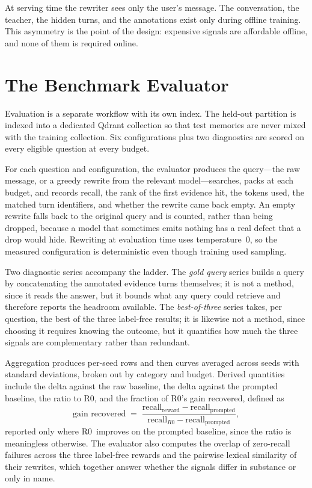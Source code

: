 \documentclass[12pt,letterpaper,oneside]{report}
\newcommand{\Rz}{R0}
\begin{document}
At serving time the rewriter sees only the user's message. The conversation,
the teacher, the hidden turns, and the annotations exist only during offline
training. This asymmetry is the point of the design: expensive signals are
affordable offline, and none of them is required online.

\section{The Benchmark Evaluator}
\label{sec:evaluator}

Evaluation is a separate workflow with its own index. The held-out partition is
indexed into a dedicated Qdrant collection so that test memories are never
mixed with the training collection. Six configurations plus two diagnostics are
scored on every eligible question at every budget.

For each question and configuration, the evaluator produces the query---the raw
message, or a greedy rewrite from the relevant model---searches, packs at each
budget, and records recall, the rank of the first evidence hit, the tokens
used, the matched turn identifiers, and whether the rewrite came back empty. An
empty rewrite falls back to the original query and is counted, rather than
being dropped, because a model that sometimes emits nothing has a real defect
that a drop would hide. Rewriting at evaluation time uses temperature~0, so the
measured configuration is deterministic even though training used sampling.

Two diagnostic series accompany the ladder. The \emph{gold query} series builds
a query by concatenating the annotated evidence turns themselves; it is not a
method, since it reads the answer, but it bounds what any query could retrieve
and therefore reports the headroom available. The \emph{best-of-three} series
takes, per question, the best of the three label-free results; it is likewise
not a method, since choosing it requires knowing the outcome, but it quantifies
how much the three signals are complementary rather than redundant.

Aggregation produces per-seed rows and then curves averaged across seeds with
standard deviations, broken out by category and budget. Derived quantities
include the delta against the raw baseline, the delta against the prompted
baseline, the ratio to \Rz, and the fraction of \Rz's gain recovered, defined
as
\[
  \text{gain recovered} \;=\;
  \frac{\text{recall}_{\text{reward}} - \text{recall}_{\text{prompted}}}
       {\text{recall}_{\Rz} - \text{recall}_{\text{prompted}}},
\]
reported only where \Rz\ improves on the prompted baseline, since the ratio is
meaningless otherwise. The evaluator also computes the overlap of zero-recall
failures across the three label-free rewards and the pairwise lexical
similarity of their rewrites, which together answer whether the signals differ
in substance or only in name.
\end{document}
